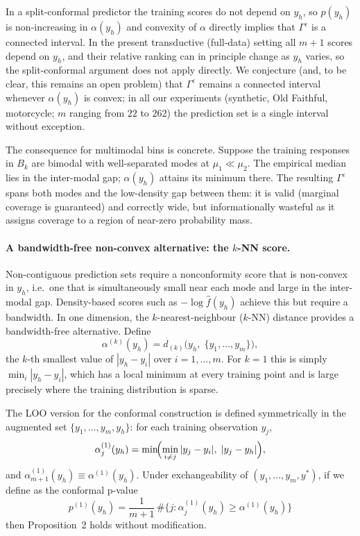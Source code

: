 \documentclass[11pt]{article}
\begin{document}
In a split-conformal predictor the training scores do not depend on $y_h$, so
$p(y_h)$ is non-increasing in $\alpha(y_h)$ and convexity of $\alpha$
directly implies that $\Gamma^\varepsilon$ is a connected interval.
In the present transductive (full-data) setting all $m+1$ scores depend on
$y_h$, and their relative ranking can in principle change as $y_h$ varies,
so the split-conformal argument does not apply directly.
We conjecture (and, to be clear, this remains an open problem) that 
$\Gamma^\varepsilon$ remains a connected interval whenever
$\alpha(y_h)$ is convex; in all our experiments (synthetic, Old Faithful,
motorcycle; $m$ ranging from $22$ to $262$) the prediction set is a single
interval without exception.

The consequence for multimodal bins is concrete.
Suppose the training responses in $B_k$ are bimodal with well-separated modes at
$\mu_1 \ll \mu_2$.
The empirical median lies in the inter-modal gap; $\alpha(y_h)$ attains its minimum
there.
The resulting $\Gamma^\varepsilon$ spans both modes and the low-density gap between
them: it is valid (marginal coverage is guaranteed) and correctly wide, but
informationally wasteful as it assigns coverage to a region of near-zero probability
mass.

\paragraph{A bandwidth-free non-convex alternative: the $k$-NN score.}
Non-contiguous prediction sets require a nonconformity score that is non-convex in
$y_h$, i.e.\ one that is simultaneously small near each mode and large in the
inter-modal gap.
Density-based scores such as $-\log \hat{f}(y_h)$ achieve this but require a bandwidth.
In one dimension, the $k$-nearest-neighbour ($k$-NN) distance provides a
bandwidth-free alternative.
Define
\[
  \alpha^{(k)}(y_h)
  = d_{(k)}\!\bigl(y_h,\;\{y_1,\ldots,y_m\}\bigr),
\]
the $k$-th smallest value of $|y_h - y_i|$ over $i = 1,\ldots,m$.
For $k=1$ this is simply $\min_i |y_h - y_i|$, which has a local minimum at every
training point and is large precisely where the training distribution is sparse.

The LOO version for the conformal construction is defined symmetrically in the augmented
set $\{y_1,\ldots,y_m,y_h\}$: for each training observation $y_j$,
\[
  \alpha^{(1)}_j(y_h)
  = \min\!\Bigl(\min_{i \ne j}|y_j - y_i|,\;|y_j - y_h|\Bigr),
\]
and $\alpha^{(1)}_{m+1}(y_h) \equiv \alpha^{(1)}(y_h)$.
Under exchangeability of $(y_1,\ldots,y_m,y^*)$, if we define as the conformal p-value
\[
  p^{(1)}(y_h)
  = \frac{1}{m+1}\,\#\bigl\{j : \alpha^{(1)}_j(y_h) \ge \alpha^{(1)}(y_h)\bigr\}
\]
then Proposition~2 holds without modification.
\end{document}
